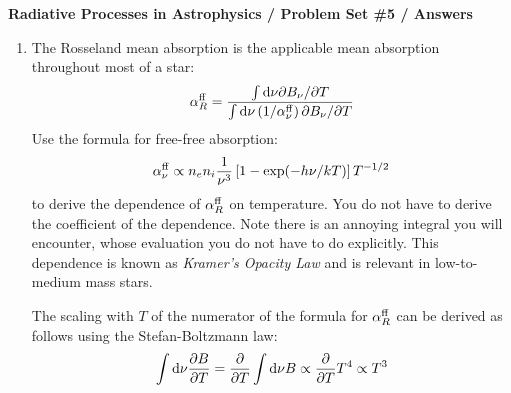 \documentclass[11pt, preprint]{article}
\begin{document}
\begin{center}
  {\bf Radiative Processes in Astrophysics / Problem Set \#5 /
    Answers}
\end{center}

\begin{enumerate}
\item 
  The Rosseland mean absorption is the applicable mean absorption
  throughout most of a star:
  \begin{equation}
    \alpha_R^{\rm ff} = \frac{\int {\rm d}\nu \partial B_\nu /
      \partial T}
    {\int {\rm d}\nu \left(1/\alpha_\nu^{\rm ff}\right) \partial B_\nu / \partial T}
  \end{equation}
  Use the formula for free-free absorption:
  \begin{equation}
    \alpha_\nu^{\rm ff} \propto n_e n_i \frac{1}{\nu^3} \left[1 -
      \exp(-h\nu/ kT)\right] T^{-1/2}
  \end{equation}
  to derive the dependence of $\alpha_R^{\rm ff}$ on temperature. You
  do not have to derive the coefficient of the dependence. Note there
  is an annoying integral you will encounter, whose evaluation you do
  not have to do explicitly. This dependence is known as {\it Kramer's
    Opacity Law} and is relevant in low-to-medium mass stars.

  \begin{answer}
    The scaling with $T$ of the numerator of the formula for $\alpha_R^{\rm
      ff}$ can be derived as follows using the Stefan-Boltzmann law:
    \begin{equation}
      \int {\rm d}\nu \frac{\partial B}{\partial T} =
      \frac{\partial}{\partial T} \int {\rm d}\nu B \propto  
      \frac{\partial}{\partial T} T^4 \propto  T^3
    \end{equation}


\end{answer}
\end{enumerate}
\end{document}

